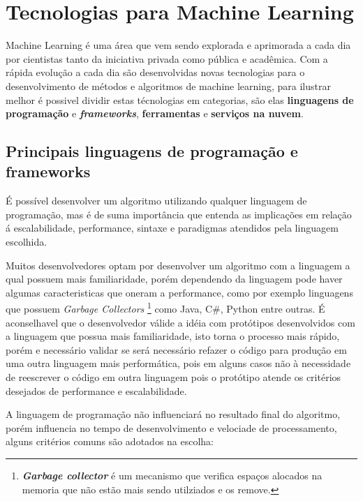 \section{Tecnologias para Machine Learning}
\label{sec:tech-ml}

Machine Learning é uma área que vem sendo explorada e aprimorada a cada dia por cientistas tanto da iniciativa privada 
como pública e acadêmica. Com a rápida evolução a cada dia são desenvolvidas novas tecnologias para o desenvolvimento
de métodos e algoritmos de machine learning, para ilustrar melhor é possivel  dividir estas técnologias em categorias, são elas
\textbf{linguagens de programação} e \textbf{\textit{frameworks}}, \textbf{ferramentas} e \textbf{serviços na nuvem}. 

\subsection{Principais linguagens de programação e frameworks}
\label{subsec:ling-prog}

É possível desenvolver um algoritmo utilizando qualquer linguagem de programação, mas é de suma importância que entenda as implicações
em relação á escalabilidade, performance, sintaxe e paradigmas atendidos pela linguagem escolhida. 

Muitos desenvolvedores optam por desenvolver um algoritmo com a linguagem a qual possuem mais familiaridade, 
porém dependendo da linguagem pode haver algumas caracteristicas que  oneram a performance, como por exemplo linguagens que possuem 
\textit{Garbage Collectors} \footnote{\textbf{\textit{Garbage collector}} é um mecanismo que verifica espaços alocados na memoria que não estão mais sendo utilziados e os remove.} como Java, C\#, Python entre outras. É aconselhavel que o desenvolvedor válide a 
idéia com protótipos desenvolvidos com a linguagem que possua mais familiaridade, isto torna o processo mais rápido, porém e necessário
validar se será necessário refazer o código para produção em uma outra linguagem mais performática, pois em alguns casos não à necessidade
de reescrever o código em outra linguagem pois o protótipo atende os critérios desejados de performance e escalabilidade. 

A linguagem de programação não influenciará no resultado final do algoritmo, porém influencia no tempo de desenvolvimento e 
velociade de processamento, alguns critérios comuns são adotados na escolha:


